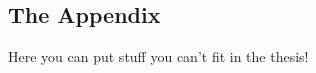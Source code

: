 \begin{refsection} 

\chapter{The Appendix} \label{appendix:one} 
\pagestyle{chapter}

Here you can put stuff you can't fit in the thesis!

\clearpage
\pagestyle{biblio}
\printbibliography

\end{refsection} 
